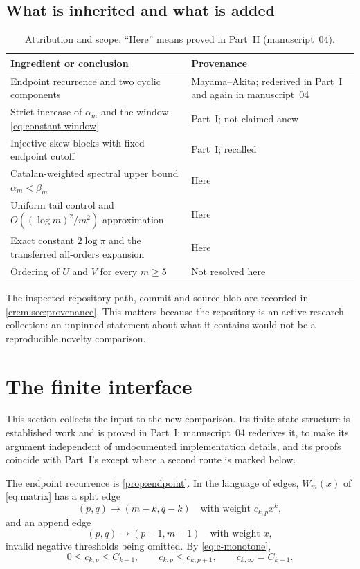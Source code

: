 \documentclass[11pt,a4paper]{article}
\theoremstyle{definition}\newaliascnt{definition}{theorem}
\theoremstyle{remark}\newaliascnt{remark}{theorem}
\begin{document}
\subsection{What is inherited and what is added}
\begin{table}[htbp]
\centering\small
\caption{Attribution and scope. ``Here'' means proved in Part~II
(manuscript~04).}
\label{crem:tab:attribution}
\begin{tabular}{p{.47\linewidth}p{.43\linewidth}}
\toprule
Ingredient or conclusion & Provenance\\
\midrule
Endpoint recurrence and two cyclic components & Mayama--Akita; rederived in
 Part~I and again in manuscript~04\\
Strict increase of $\alpha_m$ and the window \eqref{eq:constant-window}
 & Part~I; not claimed anew\\
Injective skew blocks with fixed endpoint cutoff & Part~I; recalled\\
Catalan-weighted spectral upper bound $\alpha_m<\beta_m$ & Here\\
Uniform tail control and $O((\log m)^2/m^2)$ approximation & Here\\
Exact constant $2\log\pi$ and the transferred all-orders expansion & Here\\
Ordering of $U$ and $V$ for every $m\ge5$ & Not resolved here\\
\bottomrule
\end{tabular}
\end{table}
The inspected repository path, commit and source blob are recorded in
\cref{crem:sec:provenance}. This matters because the repository is an active
research collection: an unpinned statement about what it contains would not
be a reproducible novelty comparison.

\section{The finite interface}
\label{crem:sec:finite}
This section collects the input to the new comparison. Its finite-state
structure is established work \cite{MayamaAkita} and is proved in Part~I;
manuscript~04 rederives it, to make its argument independent of undocumented
implementation details, and its proofs coincide with Part~I's except where a
second route is marked below.

The endpoint recurrence is \cref{prop:endpoint}. In the language of edges,
$W_m(x)$ of \eqref{eq:matrix} has a split edge
\begin{equation}
 (p,q)\longrightarrow(m-k,q-k)
 \quad\text{with weight }c_{k,p}x^k,
 \label{crem:eq:split-edge}
\end{equation}
and an append edge
\begin{equation}
 (p,q)\longrightarrow(p-1,m-1)
 \quad\text{with weight }x,
 \label{crem:eq:append-edge}
\end{equation}
invalid negative thresholds being omitted. By \eqref{eq:c-monotone},
\begin{equation}
 0\le c_{k,p}\le C_{k-1},\qquad
 c_{k,p}\le c_{k,p+1},\qquad c_{k,\infty}=C_{k-1}.
 \label{crem:eq:c-basic}
\end{equation}
\end{document}
